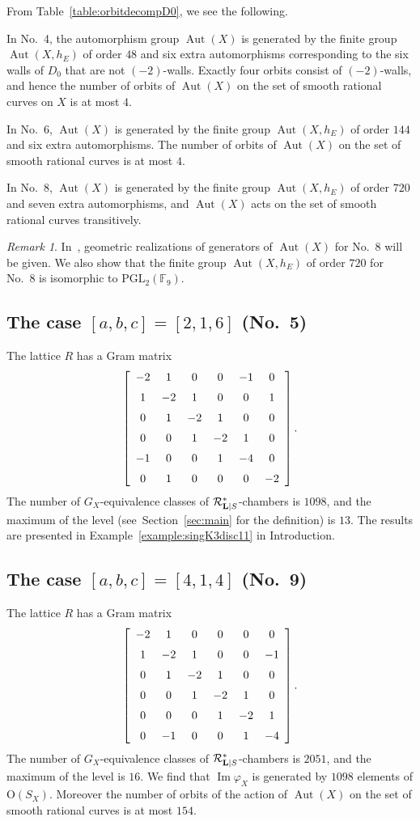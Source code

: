 \documentclass{amsart}
\theoremstyle{plain}
\theoremstyle{definition}
\theoremstyle{remark}
\newtheorem{remark}[theorem]{Remark}
\numberwithin{equation}{section}
\numberwithin{table}{section}
\numberwithin{figure}{section}
\newcommand{\F}{\mathord{\mathbb F}}
\newcommand{\RRR}{\mathord{\mathcal R}}
\newcommand{\PGL}{\mathord{\mathrm {PGL}}}
\newcommand{\OG}{\mathord{\mathrm {O}}}
\newcommand{\Image}{\operatorname{\mathrm {Im}}\nolimits}
\newcommand{\Aut}{\operatorname{\mathrm {Aut}}\nolimits}
\renewcommand{\L}{\mathord{\mathbf{L}}}
\newcommand{\Roots}{\RRR}
\newcommand{\sphyp}{\sp*}
\newcommand{\RtsLS}{\Roots_{\L|S}}
\begin{document}
%
%
From Table~\ref{table:orbitdecompD0},
we see the following.
\par
In No.~4,
the automorphism group $\Aut(X)$ is generated by the finite group $\Aut(X, h_E)$ of order $48$ and six extra automorphisms
corresponding to the six walls of $D_0$ that are not $(-2)$-walls.
Exactly four  orbits 
consist of $(-2)$-walls, and hence
the number of orbits of $\Aut(X)$ on the set of smooth rational curves on $X$ is at most $4$.
\par
In No.~6,
$\Aut(X)$ is generated by the finite group $\Aut(X, h_E)$ of order $144$ and six extra automorphisms.
The number of orbits of $\Aut(X)$ on the set of smooth rational curves is at most $4$.
\par
In No.~8,
$\Aut(X)$ is generated by the finite group $\Aut(X, h_E)$ of order $720$ and seven extra automorphisms,
and 
 $\Aut(X)$ acts on the set of smooth rational curves transitively.
%
\begin{remark}
In~\cite{ShimadaAutSingK3}, 
geometric realizations of generators of $\Aut(X)$ for No.~8 will be  given.
We also show that the finite group   $\Aut(X, h_E)$  of order $720$ for No.~8  is isomorphic to $\PGL_2(\F_9)$.
\end{remark}
%
%
\subsection{The case $[a,b,c]=[2,1,6]$ (No.~5)}\label{subsec:216}
%
The lattice $R$ has a Gram matrix
$$
\left[ \begin {array}{cccccc} 
-2&1&0&0&-1&0\\\noalign{\medskip}
1&-2&1&0&0&1\\\noalign{\medskip}
0&1&-2&1&0&0\\\noalign{\medskip}
0&0&1&-2&1&0\\\noalign{\medskip}
-1&0&0&1&-4&0\\\noalign{\medskip}
0&1&0&0&0&-2
\end {array} \right].
$$
The number of $G_X$-equivalence classes of $\RtsLS\sphyp$-chambers is $1098$,
and the maximum of the level (see~Section~\ref{sec:main} for the definition) is $13$.
The results are presented in Example~\ref{example:singK3disc11} in Introduction.
%
\subsection{The case $[a,b,c]=[4,1,4]$ (No.~9)}\label{subsec:414}
%
The lattice $R$ has a Gram matrix
$$
\left[ \begin {array}{cccccc} 
-2&1&0&0&0&0\\\noalign{\medskip}
1&-2&1&0&0&-1\\\noalign{\medskip}
0&1&-2&1&0&0\\\noalign{\medskip}
0&0&1&-2&1&0\\\noalign{\medskip}
0&0&0&1&-2&1\\\noalign{\medskip} 
0&-1&0&0&1&-4
\end {array} \right].
$$
The number of $G_X$-equivalence classes of $\RtsLS\sphyp$-chambers is $2051$,
and the maximum of the level is $16$.
We find that 
$\Image \varphi_X$ is generated by $1098$ elements of $\OG(S_X)$.
Moreover the number of orbits of the action of $\Aut(X)$ on the set of smooth rational curves is at most $154$.
%
\end{document}
